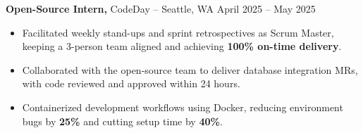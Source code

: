 \documentclass[11pt]{article}
\begin{document}
\textbf{Open-Source Intern,} {CodeDay} -- Seattle, WA \hfill April 2025 -- May 2025
\vspace{-9pt}
\begin{itemize}
  \item Facilitated weekly stand-ups and sprint retrospectives as Scrum Master, keeping a 3-person team aligned and achieving \textbf{100\% on-time delivery}.
  \item Collaborated with the open-source team to deliver database integration MRs, with code reviewed and approved within 24 hours.
  \item Containerized development workflows using Docker, reducing environment bugs by \textbf{25\%} and cutting setup time by \textbf{40\%}.
\end{itemize}

\end{document}
